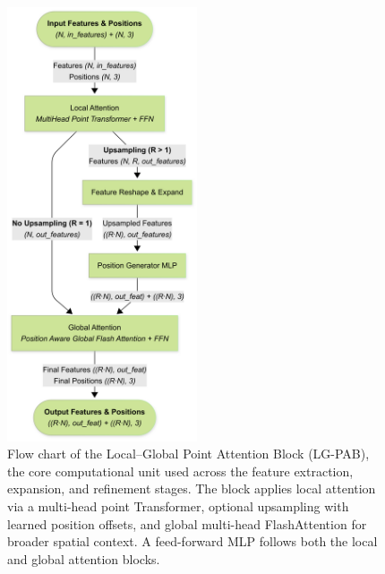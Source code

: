 \documentclass[remotesensing,article,accept,pdftex,moreauthors]{Definitions/mdpi}
\renewcommand{\hl}[1]{#1}
\begin{document}
\vspace{-9pt}

\begin{figure}[H]

  \includegraphics[trim=0mm 0mm 36mm 0mm, clip, width=0.5\textwidth]{figures/LG-PAB.png}
  \caption{\hl{Flow chart} %
 of the Local–Global Point Attention Block (LG-PAB), the core computational unit used across the feature extraction, expansion, and refinement stages. The block applies local attention via a multi-head point Transformer, optional upsampling with learned position offsets, and global multi-head FlashAttention%
  for broader spatial context. A feed-forward MLP follows both the local and global attention blocks.}
  \label{fig:lgpab}
\end{figure}

\vspace{-11pt}
\end{document}
